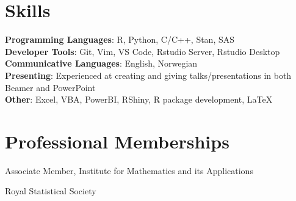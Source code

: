 \documentclass[letterpaper,11pt]{article}
\begin{document}
\section{Skills}
 \begin{itemize}[leftmargin=0.15in, label={}]
    \small{\item{
     \textbf{Programming Languages}{: R, Python, C/C++, Stan, SAS} \\
     \textbf{Developer Tools}{: Git, Vim,  VS Code, Rstudio Server, Rstudio Desktop} \\
     \textbf{Communicative Languages}: English, Norwegian \\
     \textbf{Presenting}{: Experienced at creating and giving talks/presentations in both Beamer and PowerPoint} \\
    \textbf{Other}{: Excel, VBA, PowerBI, RShiny, R package development, \LaTeX}
    }}
\end{itemize}

\section{Professional Memberships}
\begin{itemize}[leftmargin=0.15in, label={}]
    \small{\item{Associate Member, Institute for Mathematics and its Applications} \\
           \item{Royal Statistical Society}}
\end{itemize}


\end{document}
